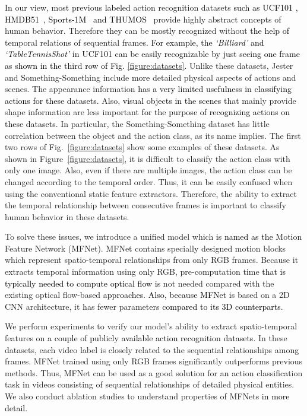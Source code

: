 \documentclass[runningheads]{llncs}
\newcommand{\nj}[1]{\textcolor{black}{#1}}
\begin{document}
In our view, most previous \nj{labeled} action recognition datasets \nj{such as UCF101 \cite{soomro2012ucf101}, HMDB51~\cite{kuehne2013hmdb51}, Sports-1M~\cite{karpathy2014large} and THUMOS~\cite{jiang2014thumos}} provide highly abstract concepts of human behavior. 
Therefore \nj{they} can be \nj{mostly} recognized without \nj{the help of} temporal relations of sequential frames. \nj{For example, the \textit{`Billiard'} and \textit{`TableTennisShot'} in UCF101 can be easily recognizable by just seeing one frame as shown in the third row of Fig. \ref{figure:datasets}.}
Unlike these datasets, Jester \cite{dataset_jester} and Something-Something \cite{goyal2017something} include \nj{more} detailed physical aspects of actions and scenes. The appearance information \nj{has a very limited usefulness in classifying actions for these datasets.}
Also, \nj{visual objects in the scenes} that mainly provide shape information are less important \nj{for the purpose of recognizing actions on these datasets}. In particular, the Something-Something dataset has little correlation between the object and the action class, as its name implies. The first two rows of Fig.~\ref{figure:datasets} show some examples of \nj{these} datasets. As shown in Figure~\ref{figure:datasets}, it is difficult to classify the action class with only one image. Also, even if there are multiple images, the action class can be changed according to the temporal order. Thus, it can be easily confused when using the conventional static feature extractors. Therefore, the ability to extract the temporal relationship between consecutive frames is important to classify human behavior in these datasets. 

To solve these issues, we introduce a unified model which \nj{is named as the} Motion Feature Network (MFNet). MFNet contains specially designed motion blocks which represent spatio-temporal relationships from only RGB frames. Because it extracts temporal information using only RGB, pre-computation time \nj{that is typically needed to compute optical flow} is not needed compared with the existing optical flow-based \nj{approaches}. \nj{Also, because MFNet is} based on a 2D CNN architecture, it has fewer parameters \nj{compared to its 3D counterparts}.

We perform experiments to verify our model's ability to extract spatio-temporal features on \nj{a couple of publicly available action recognition datasets}. In these datasets, each video label is closely related to the sequential relationships among frames. MFNet trained using only RGB frames significantly outperforms previous methods. Thus, MFNet can be used as a good solution for \nj{an} action classification task in videos consisting of sequential relationships of detailed physical entities. We also conduct ablation studies to understand properties of MFNets \nj{in more detail}. 
\end{document}
